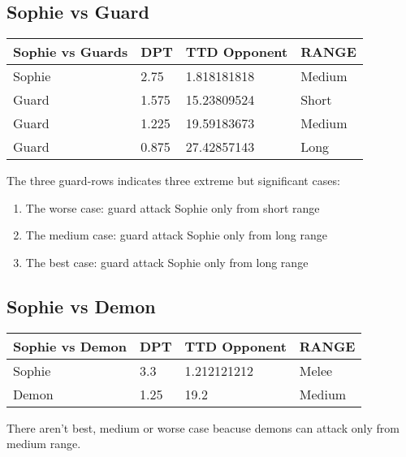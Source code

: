 \subsection{Sophie vs Guard}
\begin{table}[H]
  \centering
\begin{tabular}{|l|l|l|l|}
\hline
\rowcolor[HTML]{C0C0C0} 
\textbf{Sophie vs Guards} & \textbf{DPT} & \textbf{TTD Opponent} & \textbf{RANGE} \\ \hline
Sophie & 2.75 & 1.818181818 & Medium \\ \hline
Guard & 1.575 & 15.23809524 & Short \\ \hline
Guard & 1.225 & 19.59183673 & Medium \\ \hline
Guard & 0.875 & 27.42857143 & Long \\ \hline
\end{tabular}
\end{table}
The three guard-rows indicates three extreme but significant cases:
\begin{enumerate}
\item The worse case: guard attack Sophie only from short range
\item The medium case: guard attack Sophie only  from long range
\item The best case: guard attack Sophie only  from long range
\end{enumerate}
\subsection{Sophie vs Demon}
\begin{table}[H]
  \centering
\begin{tabular}{|l|l|l|l|}
\hline
\rowcolor[HTML]{C0C0C0} 
\textbf{Sophie vs Demon} & \textbf{DPT} & \textbf{TTD Opponent} & \textbf{RANGE} \\ \hline
Sophie & 3.3 & 1.212121212 & Melee \\ \hline
Demon & 1.25 & 19.2 & Medium \\ \hline
\end{tabular}
\end{table}
There aren't best, medium or worse case beacuse demons can attack only from medium range.
